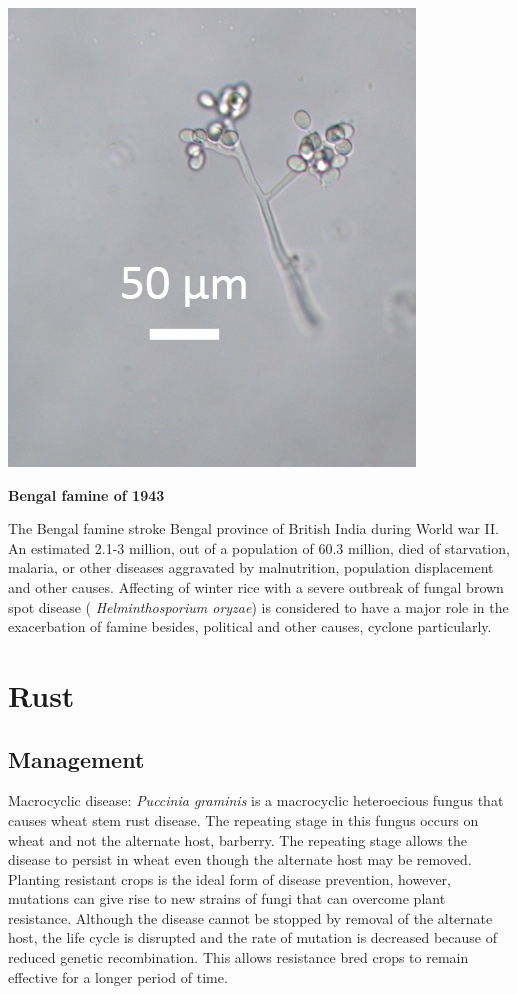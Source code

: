 \documentclass[
]{book}
\begin{document}
\begin{center}\includegraphics[width=0.8\linewidth]{./images/Plasmopara_vitticola} \end{center}

\textbf{Bengal famine of 1943}

The Bengal famine stroke Bengal province of British India during World war II. An estimated 2.1-3 million, out of a population of 60.3 million, died of starvation, malaria, or other diseases aggravated by malnutrition, population displacement and other causes. Affecting of winter rice with a severe outbreak of fungal brown spot disease ( \emph{Helminthosporium oryzae}) is considered to have a major role in the exacerbation of famine besides, political and other causes, cyclone particularly.

\hypertarget{rust}{%
\section{Rust}\label{rust}}

\hypertarget{management}{%
\subsection{Management}\label{management}}

Macrocyclic disease: \emph{Puccinia graminis} is a macrocyclic heteroecious fungus that causes wheat stem rust disease. The repeating stage in this fungus occurs on wheat and not the alternate host, barberry. The repeating stage allows the disease to persist in wheat even though the alternate host may be removed. Planting resistant crops is the ideal form of disease prevention, however, mutations can give rise to new strains of fungi that can overcome plant resistance. Although the disease cannot be stopped by removal of the alternate host, the life cycle is disrupted and the rate of mutation is decreased because of reduced genetic recombination. This allows resistance bred crops to remain effective for a longer period of time.
\end{document}
